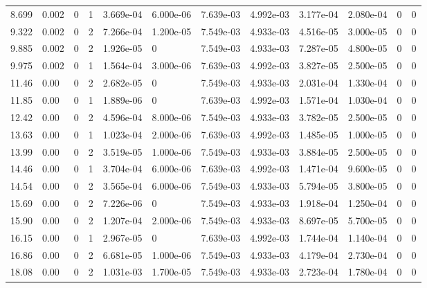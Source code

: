 \documentclass[preview]{standalone}
\begin{document}
{{\begin{tabular}{L{1.2cm}C{1.2cm} C{0.3cm}C{0.5cm} C{1.4cm}C{1.4cm} C{1.4cm}C{1.4cm} C{1.6cm}C{1.6cm} C{1.6cm}C{1.6cm}}
  8.699  &  0.002  & 0     &  1 &  3.669e-04  & 6.000e-06  &  7.639e-03&   4.992e-03& 3.177e-04 & 2.080e-04   &  0 & 0  \\ 
  9.322  &  0.002  & 0     &  2 &  7.266e-04  & 1.200e-05  &  7.549e-03&   4.933e-03& 4.516e-05 & 3.000e-05   &  0 & 0  \\ 
  9.885  &  0.002  & 0     &  2 &  1.926e-05  & 0  &  7.549e-03&   4.933e-03& 7.287e-05 & 4.800e-05   &  0 & 0  \\ 
  9.975  &  0.002  & 0     &  1 &  1.564e-04  & 3.000e-06  &  7.639e-03&   4.992e-03& 3.827e-05 & 2.500e-05   &  0 & 0  \\ 
  11.46  &  0.00  & 0     &  2 &  2.682e-05  & 0  &  7.549e-03&   4.933e-03& 2.031e-04 & 1.330e-04   &  0 & 0  \\ 
  11.85  &  0.00  & 0     &  1 &  1.889e-06  & 0  &  7.639e-03&   4.992e-03& 1.571e-04 & 1.030e-04   &  0 & 0  \\ 
  12.42  &  0.00  & 0     &  2 &  4.596e-04  & 8.000e-06  &  7.549e-03&   4.933e-03& 3.782e-05 & 2.500e-05   &  0 & 0  \\ 
  13.63  &  0.00  & 0     &  1 &  1.023e-04  & 2.000e-06  &  7.639e-03&   4.992e-03& 1.485e-05 & 1.000e-05   &  0 & 0  \\ 
  13.99  &  0.00  & 0     &  2 &  3.519e-05  & 1.000e-06  &  7.549e-03&   4.933e-03& 3.884e-05 & 2.500e-05   &  0 & 0  \\ 
  14.46  &  0.00  & 0     &  1 &  3.704e-04  & 6.000e-06  &  7.639e-03&   4.992e-03& 1.471e-04 & 9.600e-05   &  0 & 0  \\ 
  14.54  &  0.00  & 0     &  2 &  3.565e-04  & 6.000e-06  &  7.549e-03&   4.933e-03& 5.794e-05 & 3.800e-05   &  0 & 0  \\ 
  15.69  &  0.00  & 0     &  2 &  7.226e-06  & 0  &  7.549e-03&   4.933e-03& 1.918e-04 & 1.250e-04   &  0 & 0  \\ 
  15.90  &  0.00  & 0     &  2 &  1.207e-04  & 2.000e-06  &  7.549e-03&   4.933e-03& 8.697e-05 & 5.700e-05   &  0 & 0  \\ 
  16.15  &  0.00  & 0     &  1 &  2.967e-05  & 0  &  7.639e-03&   4.992e-03& 1.744e-04 & 1.140e-04   &  0 & 0  \\ 
  16.86  &  0.00  & 0     &  2 &  6.681e-05  & 1.000e-06  &  7.549e-03&   4.933e-03& 4.179e-04 & 2.730e-04   &  0 & 0  \\ 
  18.08  &  0.00  & 0     &  2 &  1.031e-03  & 1.700e-05  &  7.549e-03&   4.933e-03& 2.723e-04 & 1.780e-04   &  0 & 0  \\ 
\hline 
\end{tabular} 

}}
\end{document}
